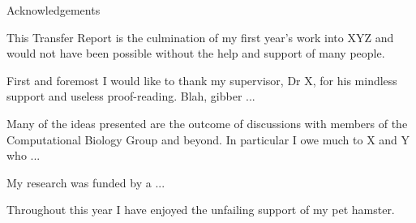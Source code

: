 \vspace*{20mm}
{
\Large\bf
\begin{center}
Acknowledgements
\end{center}
}


This Transfer Report is the culmination of my first 
year's work into XYZ and would not have
been possible without the help and support of many
people. 

First and foremost I would like to thank my supervisor,
Dr X, for his mindless support and useless proof-reading.
Blah, gibber ...

Many of the ideas presented are the outcome of discussions
with members of the Computational Biology Group and beyond. In particular I owe
much to X and Y who ...

My research was funded by a ...

Throughout this year I have enjoyed the unfailing support of
my pet hamster.
